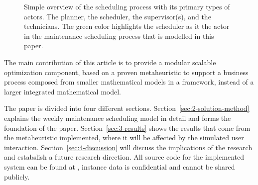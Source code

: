 \begin{figure}
	
	\caption{Simple overview of the scheduling process with its primary types of
		actors. The planner, the scheduler, the supervisor(s), and the technicians. 		
		The green color highlights the scheduler as it the actor in the maintenance
		scheduling process that is modelled in this paper.
	}\label{fig:integrated:maintenance-process}
\end{figure}

The main contribution of this article is to provide a
modular scalable optimization component, based on a proven
metaheuristic to support a business process composed from
smaller mathematical models in a framework, instead of a
larger integrated mathematical model.

The paper is divided into four different sections.
Section~\ref{sec:2-solution-method} explains the weekly maintenance
scheduling model in detail and forms the foundation of the paper. 
Section~\ref{sec:3-results} shows the results that come from the metaheuristic
implemented, where it will be affected by the simulated user interaction.
Section~\ref{sec:4-discussion} will discuss the implications of the research
and estabslish a future research direction. All source code for the implemented
system can be found at \citep{scipo-code-ordinator_api}, instance data is
confidential and cannot be shared publicly.

